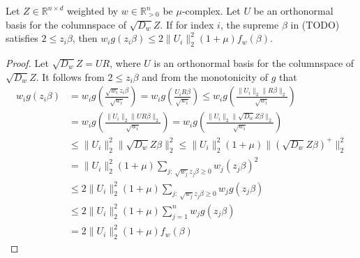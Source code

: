 \begin{lemma}
    Let $Z \in \mathbb{R}^{n \times d}$ weighted by $w \in \mathbb{R}^n_{>0}$
    be $\mu$-complex. Let $U$ be an orthonormal basis for the columnspace
    of $\sqrt{D_w} Z$. If for index $i$, the supreme $\beta$ in (TODO) satisfies
    $2 \leq z_i \beta$, then
    $w_i g(z_i \beta) \leq 2 \lVert U_i \rVert_2^2 (1 + \mu) f_w(\beta)$.
\end{lemma}
\begin{proof}
    Let $\sqrt{D_w} Z = UR$, where $U$ is an orthonormal basis for the columnspace
    of $\sqrt{D_w} Z$. It follows from $2 \leq z_i \beta$ and from the monotonicity
    of $g$ that
    \begin{align*}
        w_i g(z_i \beta)
         & = w_i g\left(\frac{\sqrt{w_i} z_i \beta}{\sqrt{w_i}}\right)
        = w_i g\left(\frac{U_i R \beta}{\sqrt{w_i}}\right)
        \leq w_i g\left(\frac{\lVert U_i \rVert_2 \lVert R \beta \rVert_2}{\sqrt{w_i}}\right)               \\
         & = w_i g\left(\frac{\lVert U_i \rVert_2 \lVert U R \beta \rVert_2}{\sqrt{w_i}}\right)
        = w_i g\left(\frac{\lVert U_i \rVert_2 \lVert \sqrt{D_w} Z \beta \rVert_2}{\sqrt{w_i}}\right)       \\
         & \leq \lVert U_i \rVert_2^2 \lVert \sqrt{D_w} Z \beta \rVert_2^2
        \leq \lVert U_i \rVert_2^2 (1 + \mu) \lVert (\sqrt{D_w} Z \beta)^+ \rVert_2^2                       \\
         & = \lVert U_i \rVert_2^2 (1 + \mu) \sum_{j: \  \sqrt{w_j} z_j \beta \geq 0} w_j (z_j \beta)^2     \\
         & \leq 2 \lVert U_i \rVert_2^2 (1 + \mu) \sum_{j: \  \sqrt{w_j} z_j \beta \geq 0} w_j g(z_j \beta) \\
         & \leq 2 \lVert U_i \rVert_2^2 (1 + \mu) \sum_{j = 1}^n w_j g(z_j \beta)                           \\
         & = 2 \lVert U_i \rVert_2^2 (1 + \mu) f_w(\beta)
    \end{align*}
\end{proof}

